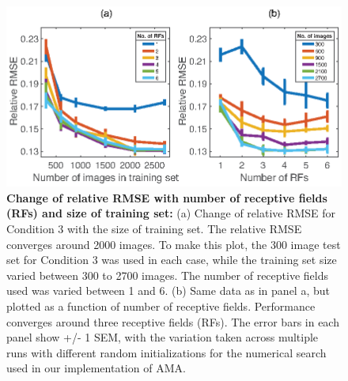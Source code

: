 \documentclass{jov}
\providecommand{\DIFaddbeginFL}{} %
\providecommand{\DIFaddendFL}{} %
\providecommand{\DIFdelbeginFL}{} %
\providecommand{\DIFdelendFL}{} %
\newcommand{\DIFscaledelfig}{0.5}
\newlength{\DIFdelgraphicswidth} %
\newlength{\DIFdelgraphicsheight} %
\newcommand{\DIFaddincludegraphics}[2][]{{\color{blue}\fbox{\DIFOincludegraphics[#1]{#2}}}} %
\newcommand{\DIFdelincludegraphics}[2][]{%
\sbox{\DIFdelgraphicsbox}{\DIFOincludegraphics[#1]{#2}}%
\settoboxwidth{\DIFdelgraphicswidth}{\DIFdelgraphicsbox} %
\settoboxtotalheight{\DIFdelgraphicsheight}{\DIFdelgraphicsbox} %
\scalebox{\DIFscaledelfig}{%
\parbox[b]{\DIFdelgraphicswidth}{\usebox{\DIFdelgraphicsbox}\\[-\baselineskip] \rule{\DIFdelgraphicswidth}{0em}}\llap{\resizebox{\DIFdelgraphicswidth}{\DIFdelgraphicsheight}{%
\setlength{\unitlength}{\DIFdelgraphicswidth}%
\begin{picture}(1,1)%
\thicklines\linethickness{2pt} %
{\color[rgb]{1,0,0}\put(0,0){\framebox(1,1){}}}%
{\color[rgb]{1,0,0}\put(0,0){\line( 1,1){1}}}%
{\color[rgb]{1,0,0}\put(0,1){\line(1,-1){1}}}%
\end{picture}%
}\hspace*{3pt}}} %
} %
\DeclareRobustCommand{\DIFaddbeginFL}{\DIFOaddbeginFL \let\includegraphics\DIFaddincludegraphics} %
\DeclareRobustCommand{\DIFaddendFL}{\DIFOaddendFL \let\includegraphics\DIFOincludegraphics} %
\DeclareRobustCommand{\DIFdelbeginFL}{\DIFOdelbeginFL \let\includegraphics\DIFdelincludegraphics} %
\DeclareRobustCommand{\DIFdelendFL}{\DIFOaddendFL \let\includegraphics\DIFOincludegraphics} %
\begin{document}
\begin{figure}
\centering
\DIFdelbeginFL %
\DIFdelendFL \DIFaddbeginFL \includegraphics{Figure13.eps}
\DIFaddendFL \caption{{\bf Change of relative RMSE with number of receptive fields (RFs) and size of training set:} (a) Change of relative RMSE for Condition 3 with the size of training set. The relative RMSE converges around 2000 images. To make this plot, the 300 image test set for Condition 3 was used in each case, while the training set size varied between 300 to 2700 images. The number of receptive fields used was varied between 1 and 6. (b) Same data as in panel a, but plotted as a function of number of receptive fields. Performance converges around three receptive fields (RFs). The error bars in each panel show +/- 1 SEM, with the variation taken across multiple runs with different random initializations for the numerical search used in our implementation of AMA.}
 \label{fig:RMSEvsRF}
\end{figure}
\end{document}
